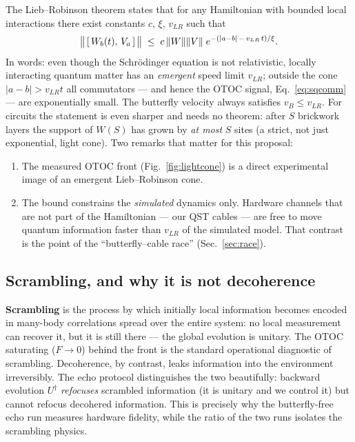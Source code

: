 \documentclass[11pt]{article}
\begin{document}
The Lieb--Robinson theorem states that for any Hamiltonian with bounded local
interactions there exist constants $c,\,\xi,\,v_{LR}$ such that
\begin{equation}
  \big\| \,[\,W_b(t),\, V_a\,]\, \big\|
  \;\leq\; c\, \norm{W}\norm{V}\;
  e^{-\left(|a-b| \,-\, v_{LR}\, t\right)/\xi} .
  \label{eq:lr}
\end{equation}
In words: even though the Schr\"odinger equation is not relativistic, locally
interacting quantum matter has an \emph{emergent} speed limit $v_{LR}$;
outside the cone $|a-b| > v_{LR} t$ all commutators --- and hence the OTOC
signal, Eq.~\eqref{eq:sqcomm} --- are exponentially small. The butterfly
velocity always satisfies $v_B \leq v_{LR}$. For circuits the statement is
even sharper and needs no theorem: after $S$ brickwork layers the support of
$W(S)$ has grown by \emph{at most} $S$ sites (a strict, not just exponential,
light cone). Two remarks that matter for this proposal:
\begin{enumerate}
  \item The measured OTOC front (Fig.~\ref{fig:lightcone}) is a direct
  experimental image of an emergent Lieb--Robinson cone.
  \item The bound constrains the \emph{simulated} dynamics only. Hardware
  channels that are not part of the Hamiltonian --- our QST cables --- are
  free to move quantum information faster than $v_{LR}$ of the simulated
  model. That contrast is the point of the ``butterfly--cable race''
  (Sec.~\ref{sec:race}).
\end{enumerate}

\subsection{Scrambling, and why it is not decoherence}

\textbf{Scrambling} is the process by which initially local information
becomes encoded in many-body correlations spread over the entire system: no
local measurement can recover it, but it is still there --- the global
evolution is unitary. The OTOC saturating ($F \to 0$) behind the front is the
standard operational diagnostic of scrambling. Decoherence, by contrast,
leaks information into the environment irreversibly. The echo protocol
distinguishes the two beautifully: backward evolution $U^\dagger$
\emph{refocuses} scrambled information (it is unitary and we control it) but
cannot refocus decohered information. This is precisely why the
butterfly-free echo run measures hardware fidelity, while the ratio of the
two runs isolates the scrambling physics.
\end{document}
